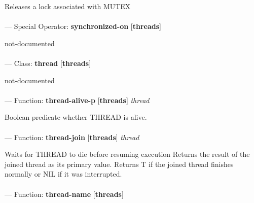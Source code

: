 \begin{adjustwidth}{5em}{5em}
Releases a lock associated with MUTEX
\end{adjustwidth}

\paragraph{}
\label{THREADS:SYNCHRONIZED-ON}
--- Special Operator: \textbf{synchronized-on} [\textbf{threads}] \textit{}

\begin{adjustwidth}{5em}{5em}
not-documented
\end{adjustwidth}

\paragraph{}
\label{THREADS:THREAD}
--- Class: \textbf{thread} [\textbf{threads}] \textit{}

\begin{adjustwidth}{5em}{5em}
not-documented
\end{adjustwidth}

\paragraph{}
\label{THREADS:THREAD-ALIVE-P}
--- Function: \textbf{thread-alive-p} [\textbf{threads}] \textit{thread}

\begin{adjustwidth}{5em}{5em}
Boolean predicate whether THREAD is alive.
\end{adjustwidth}

\paragraph{}
\label{THREADS:THREAD-JOIN}
--- Function: \textbf{thread-join} [\textbf{threads}] \textit{thread}

\begin{adjustwidth}{5em}{5em}
Waits for THREAD to die before resuming execution
Returns the result of the joined thread as its primary value.
Returns T if the joined thread finishes normally or NIL if it was interrupted.
\end{adjustwidth}

\paragraph{}
\label{THREADS:THREAD-NAME}
--- Function: \textbf{thread-name} [\textbf{threads}] \textit{}

